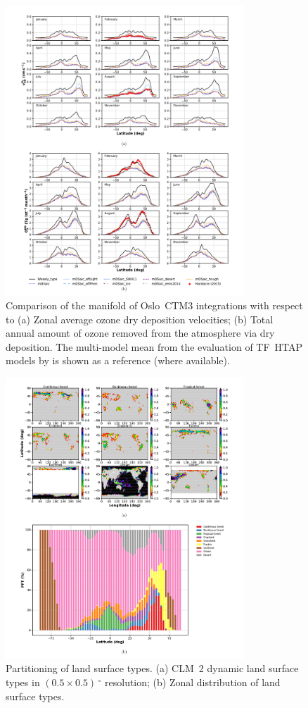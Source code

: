 \documentclass[gmd, manuscript]{copernicus}
\begin{document}
\appendixfigures
\begin{figure}[!htbp]
  \includegraphics[width=0.8\textwidth]{fig10}
  \caption{Comparison of the manifold of Oslo~CTM3 integrations with respect to (a) Zonal average ozone dry deposition velocities; (b) Total annual amount of ozone removed from the atmosphere via dry deposition. The multi-model mean from the evaluation of TF~HTAP models by \citet{ACP:Hardacre2015} is shown as a reference (where available).}
  \label{fig:mmm_drydep_season}
\end{figure}

\appendixfigures
\begin{figure}[!htbp]
  \centering
  \includegraphics[width=0.8\textwidth]{fig11}
  \caption{Partitioning of land surface types. (a) CLM~2 dynamic land surface types in $(0.5\times0.5)\,\unit{^\circ}$ resolution; (b) Zonal distribution of land surface types.}
  \label{fig:pft_landsurface}
\end{figure}
\end{document}
